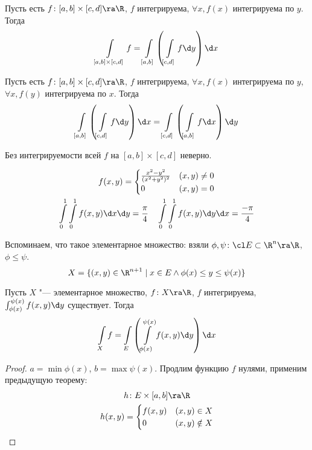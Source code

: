 \begin{conseq}
	Пусть есть $f\colon [a, b] \times [c, d] \ra \R$, $f$ интегрируема, $\forall x, \text{$f(x)$ интегрируема по $y$}$.
	Тогда
	\[ \int\limits_{[a, b] \times [c, d]} f = \int\limits_{[a, b]} \left( \int\limits_{[c, d]} f \d y \right) \d x \]
\end{conseq}
\begin{conseq}
	Пусть есть $f\colon [a, b] \times [c, d] \ra \R$, $f$ интегрируема,
	$\forall x, \text{$f(x)$ интегрируема по $y$}$, $\forall x, \text{$f(y)$ интегрируема по $x$}$.
	Тогда
	\[
		\int\limits_{[a, b]} \left( \int\limits_{[c, d]} f \d y \right) \d x
		= \int\limits_{[c, d]} \left( \int\limits_{[a, b]} f \d x \right) \d y
	\]
\end{conseq}
\begin{Rem}
	Без интегрируемости всей $f$ на $[a, b] \times [c, d]$ неверно.
	\begin{exmp}
		\begin{gather*}
			f(x, y) = \begin{cases} \frac{x^2 - y^2}{(x^2 + y^2)^2} & (x, y) \ne 0 \\ 0 & (x, y) = 0 \end{cases} \\
			\int\limits_0^1 \int\limits_0^1 f(x, y) \d x \d y = \frac\pi4 \quad \int\limits_0^1 \int\limits_0^1 f(x, y) \d y \d x = \frac{-\pi}4
		\end{gather*}
	\end{exmp}
\end{Rem}

\begin{Rem}
	Вспоминаем, что такое элементарное множество: взяли $\phi, \psi\colon \cl E \subset \R^n \ra \R$, $\phi \le \psi$.
	\[ X = \{ (x, y) \in \R^{n+1} \mid x \in E \land \phi(x) \le y \le \psi(x)\} \]
\end{Rem}
\begin{theorem}
	Пусть $X$ "--- элементарное множество, $f\colon X \ra \R$, $f$ интегрируема, $\int_{\phi(x)}^{\psi(x)} f(x, y) \d y$ существует.
	Тогда
	\[ \int\limits_X f = \int\limits_E \left( \int\limits_{\phi(x)}^{\psi(x)} f(x, y) \d y \right) \d x \]
\end{theorem}
\begin{proof}
	$a = \min \phi(x)$, $b = \max \psi(x)$.
	Продлим функцию $f$ нулями, применим предыдущую теорему:
	\begin{gather*}
		h\colon E \times [a, b] \ra \R \\
		h(x, y) = \begin{cases} f(x, y) & (x, y) \in X \\ 0 & (x, y) \notin X \end{cases}
	\end{gather*}
\end{proof}

